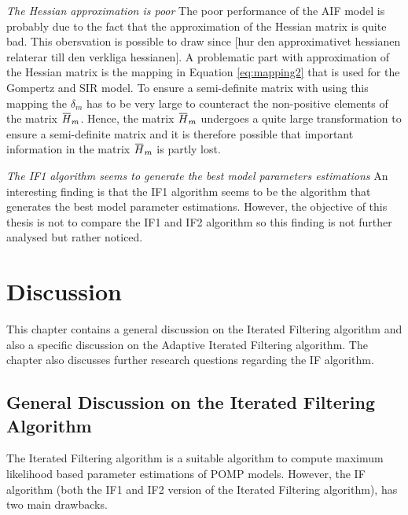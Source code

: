 \documentclass[twoside,openright]{report}
\newcommand{\overbar}[1]{\mkern 1.5mu\overline{\mkern-1.5mu#1\mkern-1.5mu}\mkern 1.5mu}
\begin{document}
\mypara \textit{ The Hessian approximation is poor } The poor performance of the AIF model is probably due to the fact that the approximation of the Hessian matrix is quite bad. This obersvation is possible to draw since [hur den approximativet hessianen relaterar till den verkliga hessianen]. A problematic part with approximation of the Hessian matrix is the mapping in Equation \ref{eq:mapping2} that is used for the Gompertz and SIR model. To ensure a semi-definite matrix with using this mapping the $\delta_m$ has to be very large to counteract the non-positive elements of the matrix $\overbar{H}_m$. Hence, the matrix $\overbar{H}_m$ undergoes a quite large transformation to ensure a semi-definite matrix and it is therefore possible that important information in the matrix $\overbar{H}_m$ is partly lost. 



\mypara \textit{ The IF1 algorithm seems to generate the best model parameters estimations } An interesting finding is that the IF1 algorithm seems to be the algorithm that generates the best model parameter estimations. However, the objective of this thesis is not to compare the IF1 and IF2 algorithm so this finding is not further analysed but rather noticed. 


\chapter{Discussion} \label{chap:discussion}

This chapter contains a general discussion on the Iterated Filtering algorithm and also a specific discussion on the Adaptive Iterated Filtering algorithm. The chapter also discusses further research questions regarding the IF algorithm.   

\section{General Discussion on the Iterated Filtering Algorithm} \label{sec:disc_IF}

The Iterated Filtering algorithm is a suitable algorithm to compute maximum likelihood based parameter estimations of POMP models. However, the IF algorithm (both the IF1 and IF2 version of the Iterated Filtering algorithm), has two  main drawbacks. 

\end{document}
